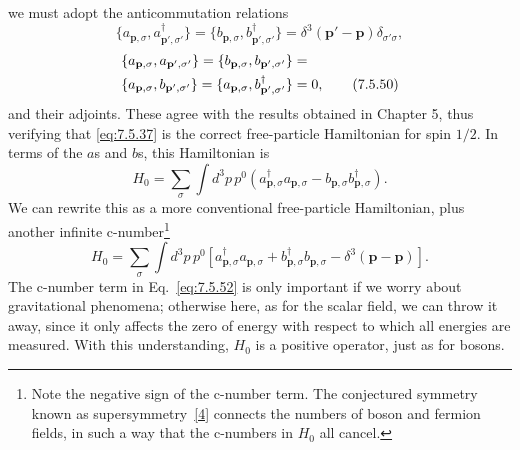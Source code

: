 
we must adopt the anticommutation relations
\begin{equation}
\{a_{\mathbf p,\sigma},a^\dagger_{\mathbf p',\sigma'}\}
=\{b_{\mathbf p,\sigma},b^\dagger_{\mathbf p',\sigma'}\}
=\delta^3(\mathbf p'-\mathbf p)\delta_{\sigma'\sigma},
\tag{7.5.49}\label{eq:7.5.49}
\end{equation}
\begin{align}
\{a_{\mathbf p,\sigma},a_{\mathbf p',\sigma'}\}
=\{b_{\mathbf p,\sigma},b_{\mathbf p',\sigma'}\}
&={}\notag\\
\{a_{\mathbf p,\sigma},b_{\mathbf p',\sigma'}\}
=\{a_{\mathbf p,\sigma},b^\dagger_{\mathbf p',\sigma'}\}&=0,
\tag{7.5.50}\label{eq:7.5.50}
\end{align}
and their adjoints. These agree with the results obtained in Chapter 5, thus
verifying that \eqref{eq:7.5.37} is the correct free-particle Hamiltonian for spin
$1/2$. In terms of the $a$s and $b$s, this Hamiltonian is
\begin{equation}
H_0=\sum_\sigma\int d^3p\,p^0
\left(a^\dagger_{\mathbf p,\sigma}a_{\mathbf p,\sigma}
-b_{\mathbf p,\sigma}b^\dagger_{\mathbf p,\sigma}\right).
\tag{7.5.51}\label{eq:7.5.51}
\end{equation}
We can rewrite this as a more conventional free-particle Hamiltonian, plus
another infinite c-number\footnote{Note the negative sign of the c-number
term. The conjectured symmetry known as supersymmetry~\hyperref[ref:7.4]{[4]} connects the numbers
of boson and fermion fields, in such a way that the c-numbers in $H_0$ all
cancel.}
\begin{equation}
H_0=\sum_\sigma\int d^3p\,p^0\left[
a^\dagger_{\mathbf p,\sigma}a_{\mathbf p,\sigma}
+b^\dagger_{\mathbf p,\sigma}b_{\mathbf p,\sigma}
-\delta^3(\mathbf p-\mathbf p)\right].
\tag{7.5.52}\label{eq:7.5.52}
\end{equation}
The c-number term in Eq.~\eqref{eq:7.5.52} is only important if we worry about
gravitational phenomena; otherwise here, as for the scalar field, we can
throw it away, since it only affects the zero of energy with respect to which
all energies are measured. With this understanding, $H_0$ is a positive
operator, just as for bosons.

